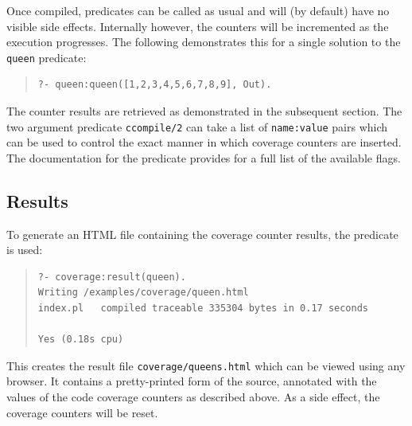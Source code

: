 Once compiled, predicates can be called as usual and will (by default)
have no visible side effects. Internally however, the counters will
be incremented as the execution progresses. The following demonstrates
this for a single solution to the {\tt queen} predicate:
\begin{quote}
\begin{verbatim}
?- queen:queen([1,2,3,4,5,6,7,8,9], Out).
\end{verbatim}
\end{quote}
The counter results are retrieved as demonstrated in the subsequent section.
The two argument predicate {\tt ccompile/2} 
 can take a list of {\tt name:value} pairs
which can be used to control the exact manner in which coverage
counters are inserted. The documentation for the 
 predicate
provides for a full list of the available flags.

\subsection{Results}

  To generate an HTML file
containing the coverage counter results, the 
 predicate is used:
\begin{quote}
\begin{verbatim}
?- coverage:result(queen).
Writing /examples/coverage/queen.html
index.pl   compiled traceable 335304 bytes in 0.17 seconds

Yes (0.18s cpu)
\end{verbatim}
\end{quote}
This creates the result file \texttt{coverage/queens.html} which
can be viewed using any browser.  It contains a pretty-printed form of
the source, annotated with the values of the code coverage counters as
described above. As a side effect, the coverage counters will be reset.

%

